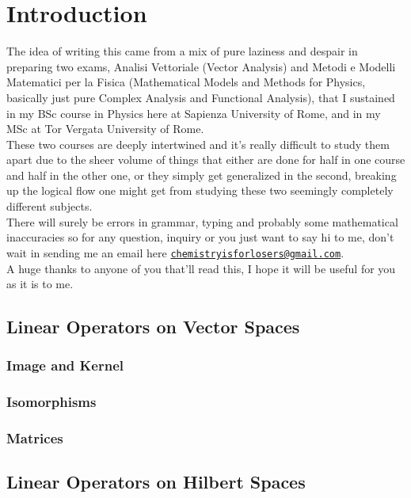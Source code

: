 \documentclass{book}
\begin{document}

\tableofcontents
\chapter*{Introduction}
The idea of writing this came from a mix of pure laziness and despair in preparing two exams, Analisi Vettoriale (Vector Analysis) and Metodi e Modelli Matematici per la Fisica (Mathematical Models and Methods for Physics, basically just pure Complex Analysis and Functional Analysis), that I sustained in my BSc course in Physics here at Sapienza University of Rome, and in my MSc at Tor Vergata University of Rome.\\
These two courses are deeply intertwined and it's really difficult to study them apart due to the sheer volume of things that either are done for half in one course and half in the other one, or they simply get generalized in the second, breaking up the logical flow one might get from studying these two seemingly completely different subjects.\\
There will surely be errors in grammar, typing and probably some mathematical inaccuracies so for any question, inquiry or you just want to say hi to me, don't wait in sending me an email here \href{mailto:cheri.1686219@studenti.uniroma1.it}{\texttt{chemistryisforlosers@gmail.com}}.\\
A huge thanks to anyone of you that'll read this, I hope it will be useful for you as it is to me.








\section{Linear Operators on Vector Spaces}
\subsection{Image and Kernel}
\subsection{Isomorphisms}
\subsection{Matrices}
\section{Linear Operators on Hilbert Spaces}
\end{document}
